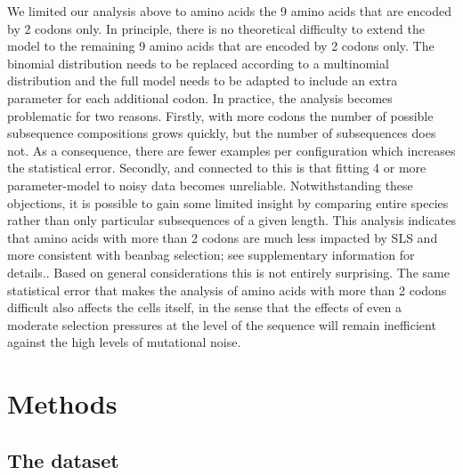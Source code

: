 \documentclass[a4paper,10pt]{paper}%
\begin{document}
\par
We  limited our analysis above to amino acids the 9 amino acids that  are encoded by  2 codons only. In principle, there is no theoretical difficulty to extend the model to  the remaining 9 amino acids that are encoded by 2 codons only. The binomial distribution needs  to be replaced according to  a multinomial distribution and the full model needs to be adapted to  include an  extra parameter for each additional codon. In practice, the analysis  becomes problematic for two reasons. Firstly, with more codons the number of possible subsequence compositions grows quickly, but the number of subsequences does not. As a consequence, there are fewer examples per configuration which increases the statistical error.  Secondly, and connected to this is that  fitting  4 or more parameter-model to noisy data becomes unreliable.  Notwithstanding these objections, it is possible to gain some limited insight  by comparing entire species rather than  only particular subsequences of a given length.  This analysis indicates that amino acids with more than 2 codons are much less impacted by SLS and more consistent with beanbag selection; see supplementary information for details.. Based on general considerations this is not entirely surprising. The same statistical error that makes the analysis of amino acids with more than 2 codons difficult also affects the cells itself, in the sense that  the effects of even a moderate selection  pressures at the level of the sequence will remain inefficient against the high levels of mutational noise. 





\section{Methods}



\subsection{The dataset}
\label{dataset}
\end{document}
